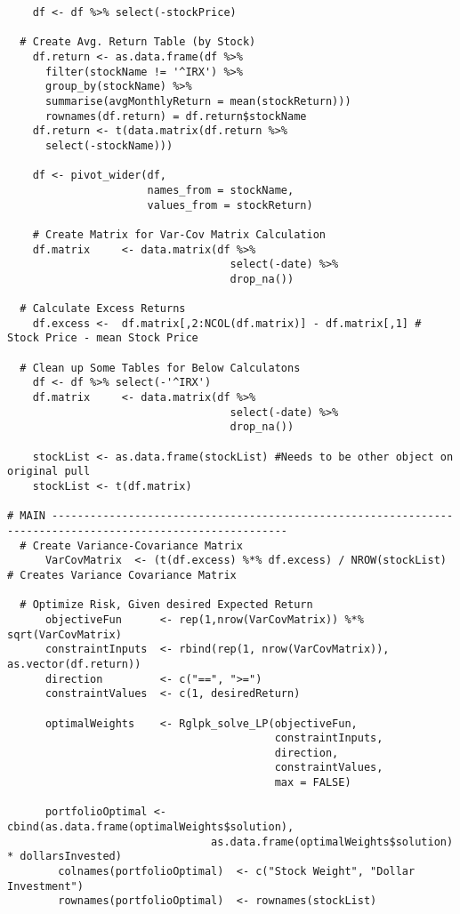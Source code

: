\documentclass[12pt,english]{article}
\begin{document}
\begin{lstlisting}
    df <- df %>% select(-stockPrice)
    
  # Create Avg. Return Table (by Stock)
    df.return <- as.data.frame(df %>%
      filter(stockName != '^IRX') %>%
      group_by(stockName) %>%
      summarise(avgMonthlyReturn = mean(stockReturn)))
      rownames(df.return) = df.return$stockName
    df.return <- t(data.matrix(df.return %>%
      select(-stockName)))
    
    df <- pivot_wider(df, 
                      names_from = stockName, 
                      values_from = stockReturn)
    
    # Create Matrix for Var-Cov Matrix Calculation
    df.matrix     <- data.matrix(df %>% 
                                   select(-date) %>%
                                   drop_na())
    
  # Calculate Excess Returns
    df.excess <-  df.matrix[,2:NCOL(df.matrix)] - df.matrix[,1] # Stock Price - mean Stock Price
    
  # Clean up Some Tables for Below Calculatons
    df <- df %>% select(-'^IRX')
    df.matrix     <- data.matrix(df %>% 
                                   select(-date) %>%
                                   drop_na())
    
    stockList <- as.data.frame(stockList) #Needs to be other object on original pull  
    stockList <- t(df.matrix)
    
# MAIN -----------------------------------------------------------------------------------------------------------
  # Create Variance-Covariance Matrix
      VarCovMatrix  <- (t(df.excess) %*% df.excess) / NROW(stockList) # Creates Variance Covariance Matrix
  
  # Optimize Risk, Given desired Expected Return
      objectiveFun      <- rep(1,nrow(VarCovMatrix)) %*% sqrt(VarCovMatrix)
      constraintInputs  <- rbind(rep(1, nrow(VarCovMatrix)), as.vector(df.return))
      direction         <- c("==", ">=")
      constraintValues  <- c(1, desiredReturn)
      
      optimalWeights    <- Rglpk_solve_LP(objectiveFun,
                                          constraintInputs,
                                          direction,
                                          constraintValues,
                                          max = FALSE)
    
      portfolioOptimal <- cbind(as.data.frame(optimalWeights$solution),
                                as.data.frame(optimalWeights$solution) * dollarsInvested)
        colnames(portfolioOptimal)  <- c("Stock Weight", "Dollar Investment")
        rownames(portfolioOptimal)  <- rownames(stockList)


\end{lstlisting}
\end{document}
